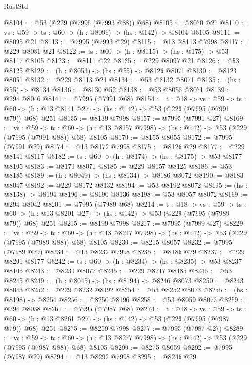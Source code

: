 \begin{lexlean}{RustStd}
\begin{coremodule}
@8104 := @53 (@229 (@7995 (@7993 @88)) @68)
@8105 := @8070 @27
@8110 := {vs : @59} -> {ts : @60} -> (h : @8099) -> (hs : @142) -> @8104 @8105
@8111 := @8095 @21
@8113 := @7995 (@7993 @29)
@8115 := @13 @8113 @7998
@8117 := @229 @8081 @21
@8122 := {ts : @60} -> (h : @8115) -> (hs : @175) -> @53 @8117 @8105
@8123 := @8111 @22
@8125 := @229 @8097 @21
@8126 := @53 @8125
@8129 := (h : @8053) -> (hs : @55) -> @8126 @8071
@8130 := @8123 @8051
@8132 := @229 @8113 @21
@8134 := @53 @8132 @8071
@8135 := (hs : @55) -> @8134
@8136 := @8130 @52
@8138 := @53 @8055 @8071
@8139 := @294 @8046
@8141 := @7995 (@7991 @68)
@8154 := {t : @18} ->
  {vs : @59} ->
  {ts : @60} -> (h : @13 @8141 @27) -> (hs : @142) -> @53 (@229 (@7995 (@7991 @79)) @68) @251
@8155 := @8139 @7998
@8157 := @7995 (@7991 @27)
@8169 := {vs : @59} ->
  {ts : @60} -> (h : @13 @8157 @7998) -> (hs : @142) -> @53 (@229 (@7995 (@7991 @88)) @68) @8105
@8170 := @8155 @8055
@8172 := @7995 (@7991 @29)
@8174 := @13 @8172 @7998
@8175 := @8126 @29
@8177 := @229 @8141 @8117
@8182 := {ts : @60} -> (h : @8174) -> (hs : @8175) -> @53 @8177 @8105
@8183 := @8170 @8071
@8185 := @229 @8157 @8125
@8186 := @53 @8185
@8189 := (h : @8049) -> (hs : @8134) -> @8186 @8072
@8190 := @8183 @8047
@8192 := @229 @8172 @8132
@8194 := @53 @8192 @8072
@8195 := (hs : @8138) -> @8194
@8196 := @8190 @8136
@8198 := @53 @8057 @8072
@8199 := @294 @8042
@8201 := @7995 (@7989 @68)
@8214 := {t : @18} ->
  {vs : @59} ->
  {ts : @60} -> (h : @13 @8201 @27) -> (hs : @142) -> @53 (@229 (@7995 (@7989 @79)) @68) @251
@8215 := @8199 @7998
@8217 := @7995 (@7989 @27)
@8229 := {vs : @59} ->
  {ts : @60} -> (h : @13 @8217 @7998) -> (hs : @142) -> @53 (@229 (@7995 (@7989 @88)) @68) @8105
@8230 := @8215 @8057
@8232 := @7995 (@7989 @29)
@8234 := @13 @8232 @7998
@8235 := @8186 @29
@8237 := @229 @8201 @8177
@8242 := {ts : @60} -> (h : @8234) -> (hs : @8235) -> @53 @8237 @8105
@8243 := @8230 @8072
@8245 := @229 @8217 @8185
@8246 := @53 @8245
@8249 := (h : @8045) -> (hs : @8194) -> @8246 @8073
@8250 := @8243 @8043
@8252 := @229 @8232 @8192
@8254 := @53 @8252 @8073
@8255 := (hs : @8198) -> @8254
@8256 := @8250 @8196
@8258 := @53 @8059 @8073
@8259 := @294 @8038
@8261 := @7995 (@7987 @68)
@8274 := {t : @18} ->
  {vs : @59} ->
  {ts : @60} -> (h : @13 @8261 @27) -> (hs : @142) -> @53 (@229 (@7995 (@7987 @79)) @68) @251
@8275 := @8259 @7998
@8277 := @7995 (@7987 @27)
@8289 := {vs : @59} ->
  {ts : @60} -> (h : @13 @8277 @7998) -> (hs : @142) -> @53 (@229 (@7995 (@7987 @88)) @68) @8105
@8290 := @8275 @8059
@8292 := @7995 (@7987 @29)
@8294 := @13 @8292 @7998
@8295 := @8246 @29

\end{coremodule}
\end{lexlean}
